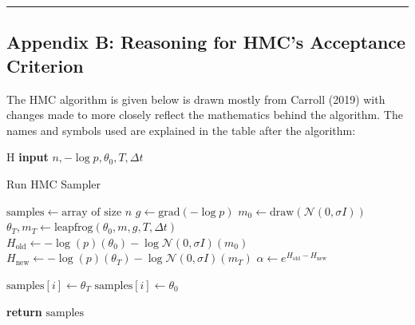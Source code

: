 \documentclass[conference]{IEEEtran}
\begin{document}
\par\noindent\rule{0.49\textwidth}{0.1pt}

\subsection*{Appendix B: Reasoning for HMC's Acceptance Criterion}
The HMC algorithm is given below is drawn mostly from Carroll (2019) with changes made to more closely reflect the mathematics behind the algorithm. The names and symbols used are explained in the table after the algorithm:\\

\begin{algorithm}{H}
\textbf{input} $n, -\log p, \theta_0, T, \Delta t$
\caption{Run HMC Sampler}
\begin{algorithmic}[H]
\State $\text{samples} \gets \text{array of size } n$
\State $g \gets \text{grad}(-\log p)$
    \State $m_0 \gets \text{draw}(\mathcal{N}(0, \sigma I))$
    \State $\theta_T, m_T \gets \text{leapfrog}(\theta_0, m, g, T, \Delta t)$
    \State $H_\text{old} \gets -\log(p)(\theta_0) - \log \mathcal{N}(0, \sigma I)(m_0)$
    \State $H_\text{new} \gets -\log(p)(\theta_T) - \log \mathcal{N}(0, \sigma I)(m_T)$
    \State $\alpha \gets e^{H_\text{old} - H_\text{new}}$
    
        \State $\text{samples}[i] \gets \theta_T$
    \Else
        \State $\text{samples}[i] \gets \theta_0$
    \EndIf
\EndFor
\end{algorithmic}
\textbf{return} $\text{samples}$
\end{algorithm}
\end{document}

